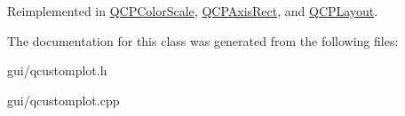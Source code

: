 Reimplemented in \hyperlink{classQCPColorScale_a259dcb6d3053a2cc3c197e9b1191ddbe}{Q\+C\+P\+Color\+Scale}, \hyperlink{classQCPAxisRect_add049d464b9ef2ccdc638adc4ccb4aca}{Q\+C\+P\+Axis\+Rect}, and \hyperlink{classQCPLayout_a48ecc9c98ea90b547c3e27a931a8f7bd}{Q\+C\+P\+Layout}.



The documentation for this class was generated from the following files\+:\begin{DoxyCompactItemize}
\item 
gui/qcustomplot.\+h\item 
gui/qcustomplot.\+cpp\end{DoxyCompactItemize}
